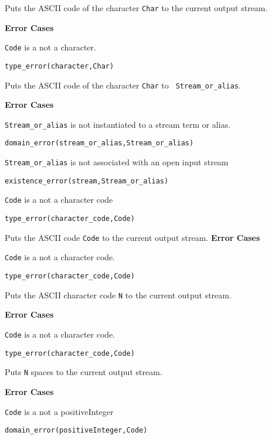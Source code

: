 \begin{description}
Puts the ASCII code of the character {\tt Char} to the current output
stream.

{\bf Error Cases}
\bi
\item 	{\tt Code} is a not a character.
\bi
\item 	{\tt type\_error(character,Char)}
\ei
\ei

Puts the ASCII code of the character {\tt Char} to {\tt
Stream\_or\_alias}.

{\bf Error Cases}
\bi
\item 	{\tt Stream\_or\_alias} is not instantiated to a stream term or alias.
\bi
\item 	{\tt domain\_error(stream\_or\_alias,Stream\_or\_alias)}
\ei
\item 	{\tt Stream\_or\_alias} is not associated with an open input stream
\bi
\item 	{\tt existence\_error(stream,Stream\_or\_alias)}
\ei
\item 	{\tt Code} is a not a character code
\bi
\item 	{\tt type\_error(character\_code,Code)}
\ei
\ei


Puts the ASCII code {\tt Code} to the current output stream.
{\bf Error Cases}
\bi
\item 	{\tt Code} is a not a character code.
\bi
\item 	{\tt type\_error(character\_code,Code)}
\ei
\ei

    Puts the ASCII character code {\tt N} to the current output stream.

{\bf Error Cases}
\bi
\item 	{\tt Code} is a not a character code.
\bi
\item 	{\tt type\_error(character\_code,Code)}
\ei
\ei

    Puts {\tt N} spaces to the current output stream. 

{\bf Error Cases}
\bi
\item 	{\tt Code} is a not a positiveInteger
\bi
\item 	{\tt domain\_error(positiveInteger,Code)}
\ei
\ei

\end{description}

